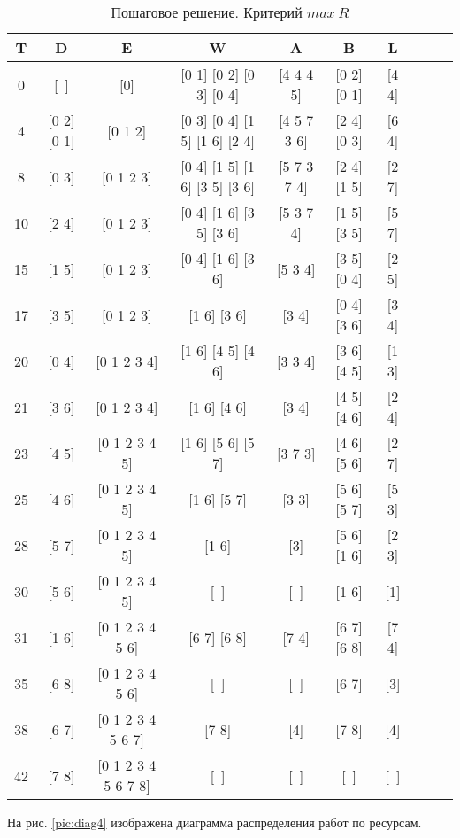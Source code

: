 \begin{table}[H]
\begin{center}
	\def\tabcolsep{2pt}
	\caption{Пошаговое решение. Критерий $max\ R$}
	\label{tab:maxr}
	\begin{tabular}{|c|c|c|c|c|c|c|c|c|c|}
	\hline 
	T & D & E & W & A & B & L\\ \hline
0 & [~] & [0] & [0 1] [0 2] [0 3] [0 4] & [4 4 4 5] & [0 2] [0 1] & [4 4] \\ \hline
4 & [0 2] [0 1] & [0 1 2] & [0 3] [0 4] [1 5] [1 6] [2 4] & [4 5 7 3 6] & [2 4] [0 3] & [6 4] \\ \hline
8 & [0 3] & [0 1 2 3] & [0 4] [1 5] [1 6] [3 5] [3 6] & [5 7 3 7 4] & [2 4] [1 5] & [2 7] \\ \hline
10 & [2 4] & [0 1 2 3] & [0 4] [1 6] [3 5] [3 6] & [5 3 7 4] & [1 5] [3 5] & [5 7] \\ \hline
15 & [1 5] & [0 1 2 3] & [0 4] [1 6] [3 6] & [5 3 4] & [3 5] [0 4] & [2 5] \\ \hline
17 & [3 5] & [0 1 2 3] & [1 6] [3 6] & [3 4] & [0 4] [3 6] & [3 4] \\ \hline
20 & [0 4] & [0 1 2 3 4] & [1 6] [4 5] [4 6] & [3 3 4] & [3 6] [4 5] & [1 3] \\ \hline
21 & [3 6] & [0 1 2 3 4] & [1 6] [4 6] & [3 4] & [4 5] [4 6] & [2 4] \\ \hline
23 & [4 5] & [0 1 2 3 4 5] & [1 6] [5 6] [5 7] & [3 7 3] & [4 6] [5 6] & [2 7] \\ \hline
25 & [4 6] & [0 1 2 3 4 5] & [1 6] [5 7] & [3 3] & [5 6] [5 7] & [5 3] \\ \hline
28 & [5 7] & [0 1 2 3 4 5] & [1 6] & [3] & [5 6] [1 6] & [2 3] \\ \hline
30 & [5 6] & [0 1 2 3 4 5] & [~] & [~] & [1 6] & [1] \\ \hline
31 & [1 6] & [0 1 2 3 4 5 6] & [6 7] [6 8] & [7 4] & [6 7] [6 8] & [7 4] \\ \hline
35 & [6 8] & [0 1 2 3 4 5 6] & [~] & [~] & [6 7] & [3] \\ \hline
38 & [6 7] & [0 1 2 3 4 5 6 7] & [7 8] & [4] & [7 8] & [4] \\ \hline
42 & [7 8] & [0 1 2 3 4 5 6 7 8] & [~] & [~] & [~] & [~] \\ \hline
	\end{tabular} 
\end{center}
\end{table}

На рис. \ref{pic:diag4} изображена диаграмма распределения работ по ресурсам.

